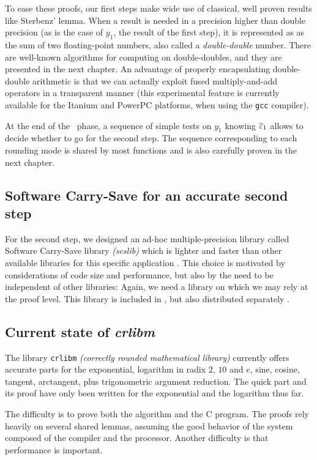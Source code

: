 To ease these proofs, our first steps make wide use of classical, well
proven results like Sterbenz' lemma. When a result is needed in a
precision higher than double precision (as is the case of $y_1$,
the result of the first step), it is represented as as the sum of two
floating-point numbers, also called a \emph{double-double} number.
There are well-known algorithms for computing on double-doubles, and
they are presented in the next chapter. An advantage of properly
encapsulating double-double arithmetic is that we can actually exploit
fused multiply-and-add operators in a transparent manner (this
experimental feature is currently available for the Itanium and
PowerPC platforms, when using the \texttt{gcc} compiler).

At the end of the \quick\ phase, a sequence of simple tests on
$y_1$ knowing ${\overline{\varepsilon}}_1$ allows to decide whether to go for
the second step. The sequence corresponding to each rounding mode is
shared by most functions and is also carefully proven in the next
chapter.


\subsection{Software Carry-Save for an accurate second step}
For the second step, we designed an ad-hoc multiple-precision library
called Software Carry-Save library \emph{(scslib)} which is lighter
and faster than other available libraries for this specific
application \cite{DefDin2002,DinDef2003}. This choice is motivated by
considerations of code size and performance, but also by the need to
be independent of other libraries: Again, we need a library on which
we may rely at the proof level. This library is included in \crlibm,
but also distributed separately \cite{SCSweb}.


\subsection{Current state of \emph{crlibm}}

The library \texttt{crlibm} \emph{(correctly rounded mathematical
  library)} currently offers accurate parts for the exponential,
logarithm in radix $2$, $10$ and $e$, sine, cosine, tangent,
arctangent, plus trigonometric argument reduction. The quick part and
its proof have only been written for the exponential and the logarithm
thus far.

The difficulty is to prove both the algorithm and the C program.
The proofs rely heavily on several shared lemmas, assuming the good
behavior of the system composed of the compiler and the processor.
Another difficulty is that performance is important.



